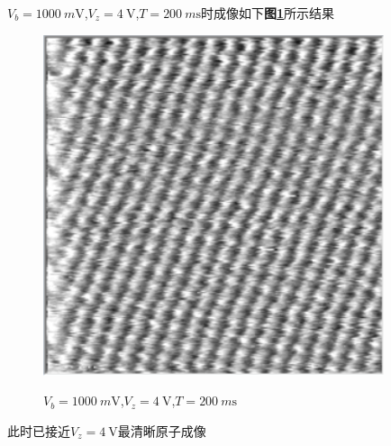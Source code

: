 \documentclass[a4paper]{article}
\begin{document}
$V_b=\SI{1000}{m\volt}$,$V_z=\SI{4}{\volt}$,$T=\SI{200}{m\s}$时成像如下\textbf{图\ref{result:fig6}}所示结果
\begin{figure}[H]
 \centering
 \caption{$V_b=\SI{1000}{m\volt}$,$V_z=\SI{4}{\volt}$,$T=\SI{200}{m\s}$}
 \includegraphics[height=10cm, width=10cm]{images/4v-1000mv-200ms.png}
 \label{result:fig6}
\end{figure}
此时已接近$V_z=\SI{4}{\volt}$最清晰原子成像
\end{document}
